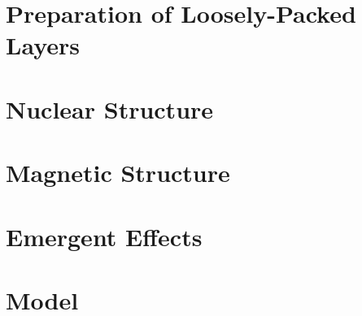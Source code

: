 \documentclass[\main/dresen_thesis.tex]{subfiles}
\begin{document}
\section{Preparation of Loosely-Packed Layers}

\section{Nuclear Structure}

\section{Magnetic Structure}

\section{Emergent Effects}

\section{Model}
\end{document}
